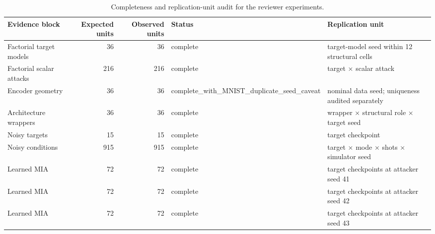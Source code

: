 \begin{table}[t]
\caption{Completeness and replication-unit audit for the reviewer experiments.}
\label{tab:experiment-completeness}
\begin{tabular}{lrrll}
\toprule
Evidence block & Expected units & Observed units & Status & Replication unit \\
\midrule
Factorial target models & 36 & 36 & complete & target-model seed within 12 structural cells \\
Factorial scalar attacks & 216 & 216 & complete & target × scalar attack \\
Encoder geometry & 36 & 36 & complete\_with\_MNIST\_duplicate\_seed\_caveat & nominal data seed; uniqueness audited separately \\
Architecture wrappers & 36 & 36 & complete & wrapper × structural role × target seed \\
Noisy targets & 15 & 15 & complete & target checkpoint \\
Noisy conditions & 915 & 915 & complete & target × mode × shots × simulator seed \\
Learned MIA & 72 & 72 & complete & target checkpoints at attacker seed 41 \\
Learned MIA & 72 & 72 & complete & target checkpoints at attacker seed 42 \\
Learned MIA & 72 & 72 & complete & target checkpoints at attacker seed 43 \\
\bottomrule
\end{tabular}
\end{table}
